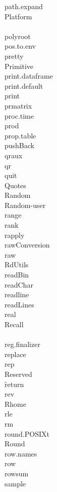 \documentclass[12pt]{article}
\begin{document}
{path.expand} \\
{Platform} \\
 \\
{polyroot} \\
{pos.to.env} \\
{pretty} \\
{Primitive} \\
{print.dataframe} \\
{print.default} \\
{print} \\
{prmatrix} \\
{proc.time} \\
{prod} \\
{prop.table} \\
{pushBack} \\
{qraux} \\
{qr} \\
{quit} \\
{Quotes} \\
{Random} \\
{Random-user} \\
{range} \\
{rank} \\
{rapply} \\
{rawConversion} \\
{raw} \\
{RdUtils} \\
{readBin} \\
{readChar} \\
{readline} \\
{readLines} \\
{real} \\
{Recall} \\
 \\
{reg.finalizer} \\
{replace} \\
{rep} \\
{Reserved} \\
\f{return} \\
{rev} \\
{Rhome} \\
{rle} \\
{rm} \\
{round.POSIXt} \\
{Round} \\
{row.names} \\
{row} \\
{rowsum} \\
{sample} \\
\end{document}
